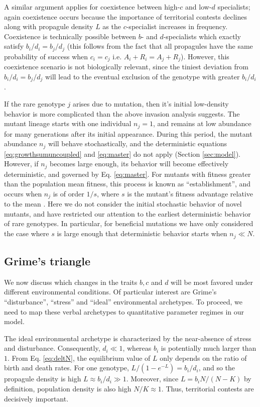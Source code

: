 \documentclass[11pt]{article}
\begin{document}
A similar argument applies for coexistence between high-$c$ and low-$d$ specialists; again coexistence occurs because the importance of territorial contests declines along with propagule density $L$ as the $c$-specialist increases in frequency. Coexistence is technically possible between $b$- and $d$-specialists which exactly satisfy $b_i/d_i=b_j/d_j$ (this follows from the fact that all propagules have the same probability of success when $c_i=c_j$ i.e. $A_i+R_i=A_j+R_j$). However, this coexistence scenario is not biologically relevant, since the tiniest deviation from $b_i/d_i=b_j/d_j$ will lead to the eventual exclusion of the genotype with greater $b_i/d_i$. 

If the rare genotype $j$ arises due to mutation, then it's initial low-density behavior is more complicated than the above invasion analysis suggests. The mutant lineage starts with one individual $n_j=1$, and remains at low abundance for many generations after its initial appearance. During this period, the mutant abundance $n_j$ will behave stochastically, and the deterministic equations \eqref{eq:growthsumuncoupled} and \eqref{eq:master} do not apply (Section \ref{sec:model}). However, if $n_j$ becomes large enough, its behavior will become effectively deterministic, and governed by Eq. \eqref{eq:master}. For mutants with fitness greater than the population mean fitness, this process is known as ``establishment'', and occurs when $n_j$ is of order $1/s$, where $s$ is the mutant's fitness advantage relative to the mean \citep{desai_2007}. Here we do not consider the initial stochastic behavior of novel mutants, and have restricted our attention to the earliest deterministic behavior of rare genotypes. In particular, for beneficial mutations we have only considered the case where $s$ is large enough that deterministic behavior starts when $n_j \ll N$.

\subsection*{Grime's triangle}\label{sec:grime}

We now discuss which changes in the traits $b, c$ and $d$ will be most favored under different environmental conditions. Of particular interest are Grime's ``disturbance'', ``stress'' and ``ideal'' environmental archetypes. To proceed, we need to map these verbal archetypes to quantitative parameter regimes in our model. 

The ideal environmental archetype is characterized by the near-absence of stress and disturbance. Consequently, $d_i\ll 1$, whereas $b_i$ is potentially much larger than $1$. From Eq. \eqref{eq:deltN}, the equilibrium value of $L$ only depends on the ratio of birth and death rates. For one genotype, $L/(1-e^{-L})=b_i/d_i$, and so the propagule density is high $L\approx b_i/d_i\gg 1$. Moreover, since $L=b_i N/(N-K)$ by definition, population density is also high $N/K\approx 1$. Thus, territorial contests are decisively important.
\end{document}
